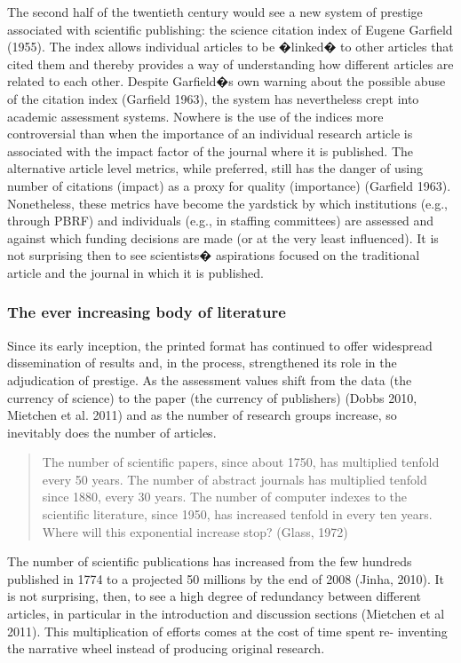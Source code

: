 \documentclass[final,authoryear,3p]{elsarticle-open-drafting}
\begin{document}
The second half of the twentieth century would see a new system of prestige associated with scientific publishing: the science 
citation index of Eugene Garfield (1955). The index allows individual articles to be �linked� to other articles that cited them and 
thereby provides a way of understanding how different articles are related to each other.  Despite Garfield�s own warning about 
the possible abuse of the citation index (Garfield 1963), the system has nevertheless crept into academic assessment systems. 
Nowhere is the use of the indices more controversial than when the importance of an individual research article is associated 
with the impact factor of the journal where it is published. The alternative article level metrics, while preferred, still has the danger 
of using number of citations (impact) as a proxy for quality (importance) (Garfield 1963). Nonetheless, these metrics have 
become the yardstick by which institutions (e.g., through PBRF) 
and individuals (e.g., in staffing committees) are assessed and 
against which funding decisions are made (or at the very least influenced). It is not surprising then to see scientists� aspirations 
focused on the traditional article and the journal in which it is published.

\subsubsection{The ever increasing body of literature}

Since its early inception, the printed format has continued to offer widespread dissemination of results and, in the process, 
strengthened its role in the adjudication of prestige. As the assessment values shift from the data (the currency of science) to the 
paper (the currency of publishers) (Dobbs 2010, Mietchen et al. 2011) and as the number of research groups increase, so 
inevitably does the number of articles.  

\begin{quote}
The number of scientific papers, since about 1750, has multiplied tenfold every 50 years. The number of abstract journals has 
multiplied tenfold since 1880, every 30 years. The number of computer indexes to the scientific literature, since 1950, has 
increased tenfold in every ten years. Where will this exponential increase stop? (Glass, 1972)
\end{quote}

The number of scientific publications has increased from the few hundreds published in 1774 to a projected 50 millions by the 
end of 2008 (Jinha, 2010). It is not surprising, then, to see a high degree of redundancy between different articles, in particular in 
the introduction and discussion sections (Mietchen et al 2011). This multiplication of efforts comes at the cost of time spent re-
inventing the narrative wheel instead of producing original research.
\end{document}
